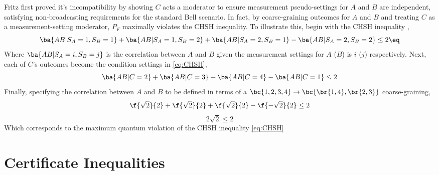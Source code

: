 \documentclass[aps, 10pt, english, twoside, pra, nofootinbib, longbibliography]{revtex4-1}
\theoremstyle{plain}
\theoremstyle{definition}
\theoremstyle{remark}
\begin{document}
    Fritz first proved it's incompatibility \cite{Fritz_2012} by showing $C$ acts a moderator to ensure measurement pseudo-settings for $A$ and $B$ are independent, satisfying non-broadcasting requirements for the standard Bell scenario. In fact, by coarse-graining outcomes for $A$ and $B$ and treating $C$ as a measurement-setting moderator, $P_F$ maximally violates the CHSH inequality. To illustrate this, begin with the CHSH inequality \cite{CHSH_Original},
    \[ \ba{AB|S_A=1, S_B=1} + \ba{AB|S_A=1, S_B=2} + \ba{AB|S_A=2, S_B=1} - \ba{AB|S_A=2, S_B=2} \leq 2 \eq \label{eq:CHSH}\]
    Where $\ba{AB|S_A=i, S_B=j}$ is the correlation between $A$ and $B$ given the measurement settings for $A$ ($B$) is $i$ ($j$) respectively. Next, each of $C$'s outcomes become the condition settings in \cref{eq:CHSH},
    \[ \ba{AB|C=2} + \ba{AB|C=3} + \ba{AB|C=4} - \ba{AB|C=1} \leq 2 \]
    Finally, specifying the correlation between $A$ and $B$ to be defined in terms of a $\bc{1,2,3,4} \rightarrow \bc{\br{1,4}, \br{2,3}}$ coarse-graining,
    \[ \f{\sqrt{2}}{2} + \f{\sqrt{2}}{2} + \f{\sqrt{2}}{2} - \f{-\sqrt{2}}{2} \leq 2 \]
    \[ 2\sqrt{2} \leq 2 \]
    Which corresponds to the maximum quantum violation of the CHSH inequality \cref{eq:CHSH}

    \section{Certificate Inequalities}
\end{document}
